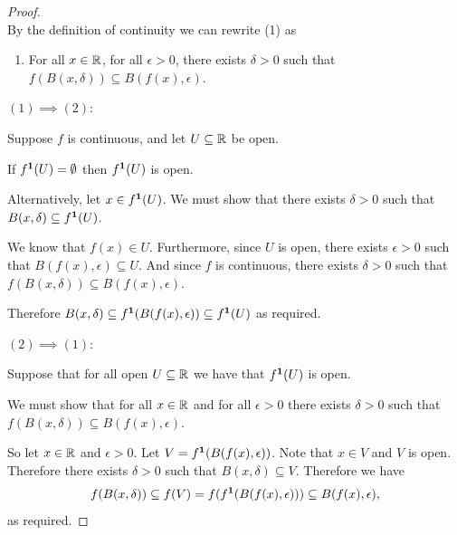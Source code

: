 \begin{proof}~\\

  By the definition of continuity we can rewrite (1) as
  \begin{enumerate}
  \item For all $x \in \mathbb{R}$, for all $\epsilon > 0$, there exists $\delta > 0$ such that
    $f(B(x, \delta)) \subseteq B(f(x), \epsilon)$.
  \end{enumerate}\hspace{0pt}

  $(1) \implies (2)$:

  Suppose $f$ is continuous, and let $U \subseteq \mathbb{R}$ be open.

  If $f^{\mathbf 1}(U) = \emptyset$ then $f^{\mathbf 1}(U)$ is open.

  Alternatively, let $x \in f^{\mathbf 1}(U)$. We must show that there exists $\delta > 0$ such that
  $B(x, \delta) \subseteq f^{\mathbf 1}(U)$.

  We know that $f(x) \in U$. Furthermore, since $U$ is open, there exists $\epsilon > 0$ such that
  $B(f(x), \epsilon) \subseteq U$. And since $f$ is continuous, there exists $\delta > 0$ such that
  $f(B(x, \delta)) \subseteq B(f(x), \epsilon)$.

  Therefore $B(x, \delta) \subseteq f^{\mathbf 1}(B(f(x), \epsilon)) \subseteq f^{\mathbf 1}(U)$ as required.

  $(2) \implies (1)$:

  Suppose that for all open $U \subseteq \mathbb{R}$ we have that $f^{\mathbf 1}(U)$ is open.

  We must show that for all $x \in \mathbb{R}$ and for all $\epsilon > 0$ there exists $\delta > 0$ such
  that $f(B(x, \delta)) \subseteq B(f(x), \epsilon)$.

  So let $x \in \mathbb{R}$ and $\epsilon > 0$. Let $V = f^{\mathbf 1}(B(f(x), \epsilon))$.  Note that $x \in V$ and
  $V$ is open. Therefore there exists $\delta > 0$ such that $B(x, \delta) \subseteq V$. Therefore
  we have
  \begin{align*}
    f(B(x, \delta))
    \subseteq f(V)
    = f(f^{\mathbf 1}(B(f(x), \epsilon)))
    \subseteq B(f(x), \epsilon),
  \end{align*}
  as required.
\end{proof}
